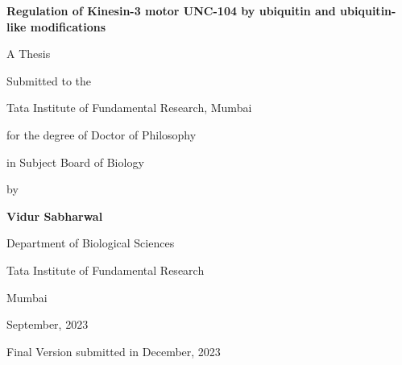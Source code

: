 \begin{titlepage}
	\centering
	\vfill
	{\huge\bfseries Regulation of Kinesin-3 motor UNC-104 by ubiquitin and ubiquitin-like modifications \par}
	\vspace{2cm}
	{\Large A Thesis\par}
	\vfill
	Submitted to the\par
	{\Large Tata Institute of Fundamental Research, Mumbai\par
	for the degree of Doctor of Philosophy\par in Subject Board of Biology \par}
	\vspace{1cm}
	by\par
	\vspace{0.5cm}
	{\Large \bfseries Vidur Sabharwal\par}
	\vfill
	
	{\large Department of Biological Sciences\par Tata Institute of Fundamental Research\par Mumbai\par}
	{September, 2023}\par
	Final Version submitted in December, 2023
\end{titlepage}